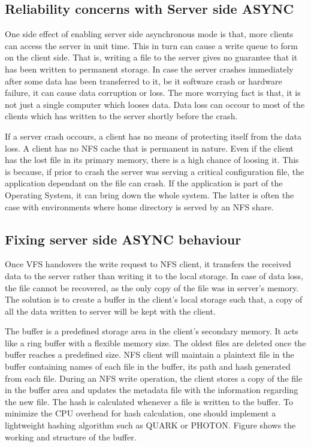 \documentclass[conference]{IEEEtran}
\begin{document}
\subsection{Reliability concerns with Server side ASYNC}\label{AA}
One side effect of enabling server side asynchronous mode is that, more
clients can access the server in unit time. This in turn can cause a write
queue to form on the client side. That is, writing a file to the server
gives no guarantee that it has been written to permanent storage. In case
the server crashes immediately after some data has been transferred to it,
be it software crash or hardware failure, it can cause data corruption or 
loss. The more worrying fact is that, it is not just a single computer which
looses data. Data loss can occour to most of the clients which has written 
to the server shortly before the crash.

If a server crash occours, a client has no means of protecting itself from
the data loss. A client has no NFS cache that is permanent in nature. Even
if the client has the lost file in its primary memory, there is a high
chance of loosing it. This is because, if prior to crash the server was
serving a critical configuration file, the application dependant on the file
can crash. If the application is part of the Operating System, it can bring
down the whole system. The latter is often the case with environments where
home directory is served by an NFS share.

\subsection{Fixing server side ASYNC behaviour}

Once VFS handovers the write request to NFS client, it transfers the 
received data to the server rather than writing it to the local storage. In
case of data loss, the file cannot be recovered, as the only copy of the
file was in server's memory. The solution is to create a buffer in the 
client's local storage such that, a copy of all the data written to server 
will be kept with the client.

The buffer is a predefined storage area in the client's secondary memory.
It acts like a ring buffer with a flexible memory size. The oldest files are
deleted once the buffer reaches a predefined size. NFS client will maintain
a plaintext file in the buffer containing names of each file in the buffer,
its path and hash generated from each file. During an NFS write operation,
the client stores a copy of the file in the buffer area and updates the 
metadata file with the information regarding the  new file. The hash is
calculated whenever a file is written to the buffer. To minimize the CPU
overhead for hash calculation, one should implement a lightweight hashing
algorithm such as QUARK or PHOTON. Figure shows the working and structure of
the buffer.
\end{document}
